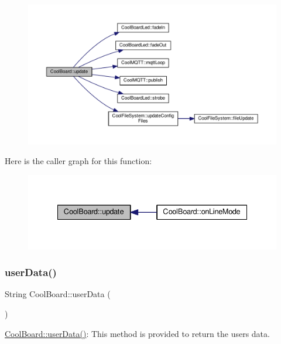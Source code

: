 \begin{figure}[H]
\begin{center}
\leavevmode
\includegraphics[width=350pt]{classCoolBoard_a8612756d3f73198cdde857a66f0fe690_cgraph}
\end{center}
\end{figure}
Here is the caller graph for this function\+:
\nopagebreak
\begin{figure}[H]
\begin{center}
\leavevmode
\includegraphics[width=335pt]{classCoolBoard_a8612756d3f73198cdde857a66f0fe690_icgraph}
\end{center}
\end{figure}
\mbox{\label{classCoolBoard_ae7358fb6e623cfc81b775f5f1734909b}} 
\subsubsection{\texorpdfstring{user\+Data()}{userData()}}
{\footnotesize\ttfamily String Cool\+Board\+::user\+Data (\begin{DoxyParamCaption}{ }\end{DoxyParamCaption})}

\hyperlink{classCoolBoard_ae7358fb6e623cfc81b775f5f1734909b}{Cool\+Board\+::user\+Data()}\+: This method is provided to return the user\textquotesingle{}s data.

